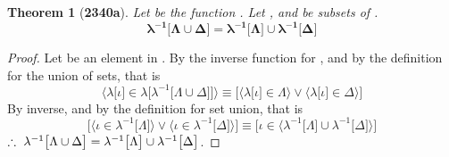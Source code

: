 \documentclass[preview]{standalone}
\newtheorem{theorem}{Theorem}
\begin{document}
\begin{theorem}[\textbf{2340a}]
    Let \bm{$\lambda$} be the function 
    . 
    Let \bm{$\Lambda$}, and \bm{$\Delta$} 
    be subsets of .
    \begin{equation*}
        \bm{
        \lambda ^{-1} \big[ \Lambda \cup \Delta \big] 
            = 
        \lambda ^{-1} 
            \big[ \Lambda \big] 
                \cup 
            \lambda^{-1} \big[ \Delta \big]
        }
    \end{equation*}
\end{theorem}

\begin{proof}
    Let \bm{$\iota$} be an element in .
    By the inverse function for
    , 
    and by the definition for the union of sets, that is 
    \begin{equation*}
        \bigg \langle \lambda 
            \big[ \iota \big] 
                \in 
            \lambda \Big[ 
                \lambda ^{-1} \big[ \Lambda \cup \Delta \big]
            \Big]
        \bigg \rangle
            \equiv
        \bigg[
            \Big \langle \lambda \big[ \iota \big] \in \Lambda \Big \rangle
                \lor 
            \Big \langle \lambda \big[ \iota \big] \in \Delta \Big \rangle
        \bigg]
    \end{equation*}
    By \bm{$\lambda$} inverse, and by the definition for set union, that is
    \begin{equation*}
        \bigg[
            \Big \langle
                \iota \in \lambda^{-1} \big[ \Lambda \big] 
            \Big \rangle
                \lor 
            \Big \langle
                \iota \in \lambda^{-1} \big[ \Delta \big]
            \Big \rangle
        \bigg]
            \equiv
        \bigg[ 
            \iota \in \Big \langle
                \lambda ^{-1} \big[ \Lambda \big] 
                    \cup 
                \lambda ^{-1} \big[ \Delta \big]
            \Big \rangle
        \bigg]
    \end{equation*}
    $\therefore \text{\space} \relax{
    \lambda ^{-1} \big[ \Lambda \cup \Delta \big] 
        = 
    \lambda ^{-1} 
        \big[ \Lambda \big] 
            \cup 
        \lambda^{-1} \big[ \Delta \big]
    }$.
\end{proof}
\end{document}
